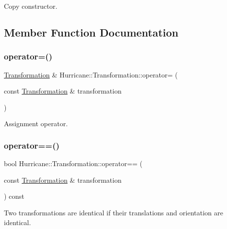 Copy constructor. 

\subsection{Member Function Documentation}
\mbox{\label{classHurricane_1_1Transformation_aad1158c828cc8ad72eb9f17804495cd2}} 
\subsubsection{\texorpdfstring{operator=()}{operator=()}}
{\footnotesize\ttfamily \mbox{\hyperlink{classHurricane_1_1Transformation}{Transformation}} \& Hurricane\+::\+Transformation\+::operator= (\begin{DoxyParamCaption}\item[{const \mbox{\hyperlink{classHurricane_1_1Transformation}{Transformation}} \&}]{transformation }\end{DoxyParamCaption})}

Assignment operator. \mbox{\label{classHurricane_1_1Transformation_a6dbb6fe21e65506f35e1ee21d09e8447}} 
\subsubsection{\texorpdfstring{operator==()}{operator==()}}
{\footnotesize\ttfamily bool Hurricane\+::\+Transformation\+::operator== (\begin{DoxyParamCaption}\item[{const \mbox{\hyperlink{classHurricane_1_1Transformation}{Transformation}} \&}]{transformation }\end{DoxyParamCaption}) const}

Two transformations are identical if their translations and orientation are identical. \mbox{\label{classHurricane_1_1Transformation_a7cb2ff77e4297fadbbf357d654de66a6}} 
